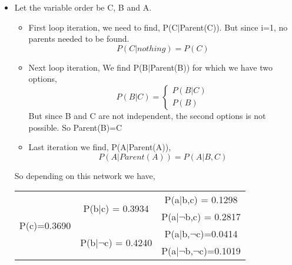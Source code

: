 \documentclass[letter, 11pt]{article}
\begin{document}
\begin{itemize}
    
    \item[(2)] Let the variable order be C, B and A.\\
    \begin{itemize}
        \item[-] First loop iteration, we need to find, P(C$|$Parent(C)). But since i=1, no parents needed to be found.
                \begin{equation*}
                    P(C|nothing) = P(C)
                \end{equation*}
        \item[-] Next loop iteration, We find P(B$|$Parent(B)) for which we have two options,
                \begin{equation*}
                    P(B|C) = \begin{cases}
                                P(B|C)\\
                                P(B)
                            \end{cases}
                \end{equation*}
                But since B and C are not independent, the second options is not possible. So Parent(B)=C
        \item[-] Last iteration we find, P(A$|$Parent(A)),
                \begin{equation*}
                    P(A|Parent(A)) = P(A|B,C) 
                \end{equation*}
    \end{itemize}
    So depending on this network we have,\\
    \begin{tabular}{ |c|c|c| } 
        \hline
        \multirow{4}{*}{P(c)=0.3690} & \multirow{2}{*}{P(b$|$c) = 0.3934} & P(a$|$b,c) = 0.1298 \\\cline{3-3}
        & & P(a$|\neg$b,c) = 0.2817 \\ \cline{2-3}
        & \multirow{2}{*}{P(b$|\neg$c) = 0.4240} & P(a$|$b,$\neg$c)=0.0414 \\\cline{3-3}
        & & P(a$|\neg$b,$\neg$c)=0.1019 \\
        \hline
    \end{tabular}
    \begin{tikzpicture}[baseline={(current bounding box.east)},->,>=stealth',shorten >=1pt,auto,node distance=3cm,thick,main node/.style={circle,draw,font=\sffamily\Large\bfseries}]


\end{tikzpicture}
\end{itemize}
\end{document}

